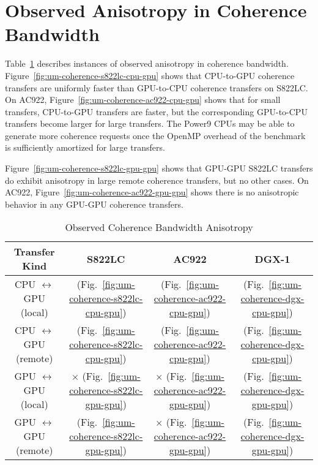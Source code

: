 \section{Observed Anisotropy in Coherence Bandwidth}

Table~\ref{tab:um-coherence-anisotropy} describes instances of observed anisotropy in coherence bandwidth.
Figure~\ref{fig:um-coherence-s822lc-cpu-gpu} shows that CPU-to-GPU coherence transfers are uniformly faster than GPU-to-CPU coherence transfers on S822LC.
On AC922, Figure~\ref{fig:um-coherence-ac922-cpu-gpu} shows that for small transfers, CPU-to-GPU transfers are faster, but the corresponding GPU-to-CPU transfers become larger for large transfers.
The Power9 CPUs may be able to generate more coherence requests once the OpenMP overhead of the benchmark is sufficiently amortized for large transfers.

Figure~\ref{fig:um-coherence-s822lc-gpu-gpu} shows that GPU-GPU S822LC transfers do exhibit anisotropy in large remote coherence transfers, but no other cases.
On AC922, Figure~\ref{fig:um-coherence-ac922-gpu-gpu} shows there is no anisotropic behavior in any GPU-GPU coherence transfers.

\begin{table}[ht]
	\centering
	\caption[]{Observed Coherence Bandwidth Anisotropy}
	\label{tab:um-coherence-anisotropy}
	\begin{tabular}{|c|c|c|c|}
		\hline
		\textbf{Transfer Kind}             & \textbf{S822LC}                                         & \textbf{AC922}                                         & \textbf{DGX-1}                            \\ \hline 
		CPU $\leftrightarrow$ GPU (local)  & \checkmark (Fig.~\ref{fig:um-coherence-s822lc-cpu-gpu}) & \checkmark (Fig.~\ref{fig:um-coherence-ac922-cpu-gpu}) & (Fig.~\ref{fig:um-coherence-dgx-cpu-gpu}) \\ \hline
		CPU $\leftrightarrow$ GPU (remote) & \checkmark (Fig.~\ref{fig:um-coherence-s822lc-cpu-gpu}) & \checkmark (Fig.~\ref{fig:um-coherence-ac922-cpu-gpu}) & (Fig.~\ref{fig:um-coherence-dgx-cpu-gpu}) \\ \hline
		GPU $\leftrightarrow$ GPU (local)  & $\times$   (Fig.~\ref{fig:um-coherence-s822lc-gpu-gpu}) & $\times$   (Fig.~\ref{fig:um-coherence-ac922-gpu-gpu}) & (Fig.~\ref{fig:um-coherence-dgx-gpu-gpu}) \\ \hline
		GPU $\leftrightarrow$ GPU (remote) & \checkmark (Fig.~\ref{fig:um-coherence-s822lc-gpu-gpu}) & $\times$   (Fig.~\ref{fig:um-coherence-ac922-gpu-gpu}) & (Fig.~\ref{fig:um-coherence-dgx-gpu-gpu}) \\ \hline
	\end{tabular}
\end{table}

